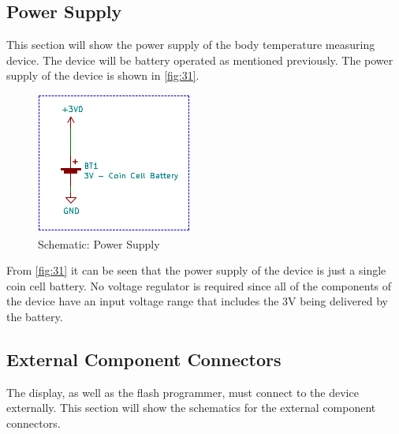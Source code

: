 \subsection{Power Supply}
This section will show the power supply of the body temperature measuring device. The device will be battery operated as mentioned previously. The power supply of the device is shown in \autoref{fig:31}.
\begin{figure}[H]
	\centering
	\includegraphics[scale=0.7]{img/Schematic_Battery}
	\caption{Schematic: Power Supply}
	\label{fig:31}
\end{figure}
\noindent
From \autoref{fig:31} it can be seen that the power supply of the device is just a single coin cell battery. No voltage regulator is required since all of the components of the device have an input voltage range that includes the 3V being delivered by the battery. 

\subsection{External Component Connectors}
The display, as well as the flash programmer, must connect to the device externally. This section will show the schematics for the external component connectors.
